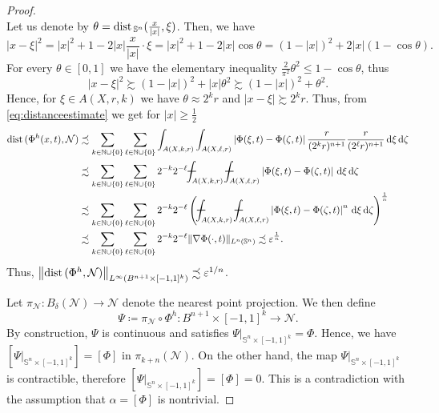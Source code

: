 \documentclass[12pt]{amsart}
\def\eps{\varepsilon}
\def\B{{B}}
\def\n{{\mathcal M}}
\newcommand{\dif}{\,\mathrm{d}}
\def\N{{\mathbb N}}
\def\n{{\mathcal{M}}}
\def\n{{\mathcal N}}
\def\S{{\mathbb S}}
\def\dist{{\rm dist\,}}
\newcommand{\brac}[1]{\left (#1 \right )}
\newcommand{\abs}[1]{\left |#1 \right |}
\newcommand{\barint}{
\rule[.036in]{.12in}{.009in}\kern-.16in \displaystyle\int }
\numberwithin{theorem}{section} \numberwithin{equation}{section}
\newcommand{\aleq}{\precsim}
\newcommand{\ageq}{\succsim}
\begin{document}
\begin{proof}
\[\]
Let us denote by $\theta = \dist_{\S^n}(\frac{x}{|x|},\xi)$. Then, we have
\[
 |x-\xi|^2 = |x|^2+1-2|x|\frac{x}{|x|}\cdot \xi = |x|^2+1-2|x|\cos\theta = (1-|x|)^2+2|x|(1-\cos\theta).
 \]
For every $\theta\in[0,1]$ we have the elementary inequality $\frac{2}{\pi^2}\theta^2\leq 1-\cos \theta$, thus
\[
 |x-\xi|^2\ageq (1-|x|)^2+|x|\theta^2 \ageq (1-|x|)^2 + \theta^2.
\]
Hence, for $\xi \in A(X,r,k)$ we have $\theta \approx 2^k r$ and $|x-\xi|\ageq 2^k r$. Thus, from \eqref{eq:distanceestimate} we get for $|x|\ge \frac 12$
\[
\begin{split}
 \dist(\Phi^h(x,t),\n) 
 &\aleq \sum_{k\in \N\cup\{0\}}\sum_{\ell\in\N\cup\{0\}}\int_{A(X,k,r)}\int_{A(X,\ell,r)} \abs{\Phi(\xi,t) - \Phi(\zeta,t)}\frac{r}{(2^k r)^{n+1}}\frac{r}{(2^\ell r)^{n+1}}\dif \xi \dif \zeta\\
 &\aleq \sum_{k\in \N\cup\{0\}}\sum_{\ell\in\N\cup\{0\}}2^{-k} 2^{-\ell}\barint_{A(X,k,r)}\barint_{A(X,\ell,r)} \abs{\Phi(\xi,t) - \Phi(\zeta,t)}\dif \xi \dif \zeta\\
 &\aleq \sum_{k\in \N\cup\{0\}}\sum_{\ell\in\N\cup\{0\}}2^{-k} 2^{-\ell} \brac{\barint_{A(X,k,r)}\barint_{A(X,\ell,r)} \abs{\Phi(\xi,t) - \Phi(\zeta,t)}^n\dif \xi \dif \zeta}^\frac{1}{n}\\
 &\aleq \sum_{k\in \N\cup\{0\}}\sum_{\ell\in\N\cup\{0\}}2^{-k} 2^{-\ell} \|\nabla \Phi(\cdot,t)\|_{L^n(\S^n)} \aleq \eps^{\frac 1n}.
 \end{split}
\]
Thus, $\left\| \dist(\Phi^h,\n) \right\|_{L^{\infty}(B^{n+1}\times[-1,1]^k)} \aleq \eps^{1/n}$.


Let $\pi_{\n}\colon B_{\delta}(\n) \to \n$ denote the nearest point projection. We then define
\[
 \Psi\coloneqq \pi_{\n} \circ \Phi^h \colon \B^{n+1} \times [-1,1]^k \to \n.
\]
By construction, $\Psi$ is continuous and satisfies
$
\Psi  \rvert_{\S^n\times [-1,1]^k} = \Phi.
$
Hence, we have $\left[\Psi \rvert_{\S^n\times [-1,1]^k} \right] = [\Phi]$ in $\pi_{k+n}(\n)$. On the other hand, the map $\Psi\rvert_{\S^n\times [-1,1]^k}$ is contractible, therefore $\left[\Psi\rvert_{\S^n\times [-1,1]^k} \right]=[\Phi]=0$. This is a contradiction with the assumption that $\alpha=[\Phi]$ is nontrivial.
\end{proof}
\end{document}
